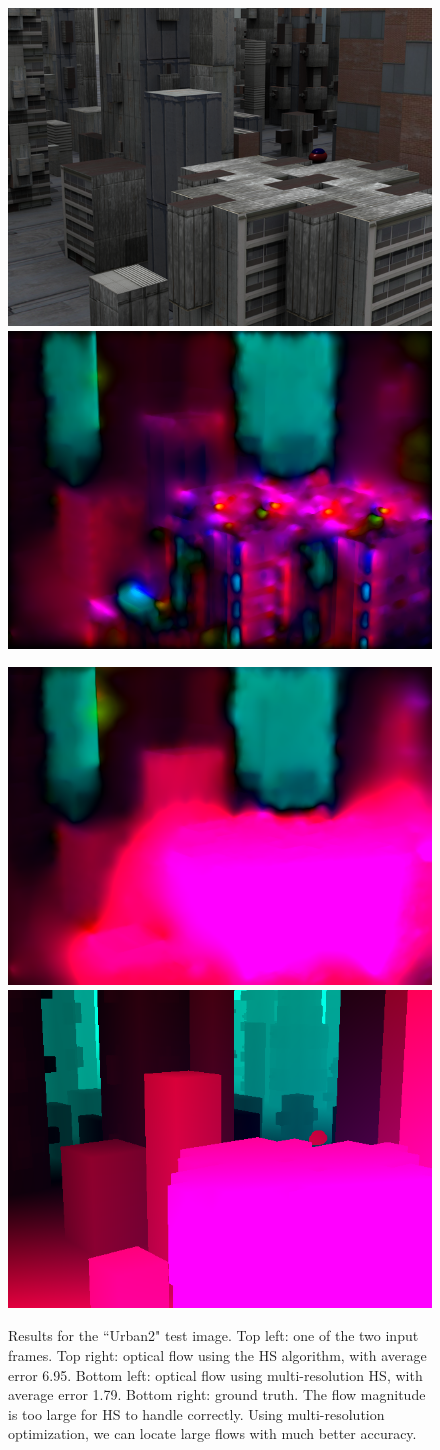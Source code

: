 \documentclass[10pt,twocolumn,letterpaper]{article}
\begin{document}
\begin{figure}
\includegraphics[width=0.48 \columnwidth] {urban2_input.png} 
\includegraphics[width=0.48 \columnwidth] {urban2.png}

\includegraphics[width=0.48 \columnwidth] {urban2_multires.png} 
\includegraphics[width=0.48 \columnwidth] {urban2_truth.png} 

\caption{Results for the ``Urban2" test image.  Top left: one of the two input frames.  Top right: optical flow using the HS algorithm, with average error 6.95.  Bottom left: optical flow using multi-resolution HS, with average error 1.79.  Bottom right: ground truth.  The flow magnitude is too large for HS to handle correctly.  Using multi-resolution optimization, we can locate large flows with much better accuracy.}
\label{fig:urban2}
\end{figure}

{\small


}
\end{document}
